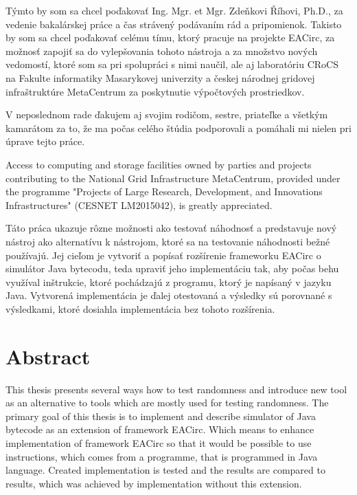 \documentclass[12pt,twoside]{fithesis2}
\renewcommand{\_}{\leavevmode \kern0.0em\vbox{\hrule width0.4em}}
\begin{document}
\FrontMatter
\ThesisTitlePage

\begin{ThesisDeclaration}
\DeclarationText
\AdvisorName
\end{ThesisDeclaration}

\begin{ThesisThanks}
Týmto by som sa chcel poďakovať Ing. Mgr. et Mgr. Zdeňkovi Říhovi, Ph.D., za vedenie bakalárskej práce a čas strávený podávaním rád a pripomienok. Takisto by som sa chcel poďakovať celému tímu, ktorý pracuje na projekte EACirc, za možnosť zapojiť sa do vylepšovania tohoto nástroja a za množstvo nových vedomostí, ktoré som sa pri spolupráci s nimi naučil, ale aj laboratóriu CRoCS na Fakulte informatiky Masarykovej univerzity a českej národnej gridovej infraštruktúre MetaCentrum za poskytnutie výpočtových prostriedkov.

V neposlednom rade ďakujem aj svojim rodičom, sestre, priateľke a všetkým kamarátom za to, že ma počas celého štúdia podporovali a pomáhali mi nielen pri úprave tejto práce.

Access to computing and storage facilities owned by parties and projects contributing to the National Grid Infrastructure MetaCentrum, provided under the programme "Projects of Large Research, Development, and Innovations Infrastructures" (CESNET LM2015042), is greatly appreciated.
\end{ThesisThanks}

\begin{ThesisAbstract}
Táto práca ukazuje rôzne možnosti ako testovať náhodnosť a predstavuje nový nástroj ako alternatívu k nástrojom, ktoré sa na testovanie náhodnosti bežné používajú. Jej cieľom je vytvoriť a popísať rozšírenie frameworku EACirc o simulátor Java bytecodu, teda upraviť jeho implementáciu tak, aby počas behu využíval inštrukcie, ktoré pochádzajú z programu, ktorý je napísaný v jazyku Java. Vytvorená implementácia je ďalej otestovaná a výsledky sú porovnané s výsledkami, ktoré dosiahla implementácia bez tohoto rozšírenia.  
\end{ThesisAbstract}

\chapter*{Abstract}
This thesis presents several ways how to test randomness and introduce new tool as an alternative to tools which are mostly used for testing randomness.  The primary goal of this thesis is to implement and describe simulator of Java bytecode as an extension of framework EACirc. Which means to enhance implementation of framework EACirc so that it would be possible to use instructions, which comes from a programme, that is programmed in Java language.  Created implementation is tested and the results are compared to results, which was achieved by implementation without this extension.
\end{document}
